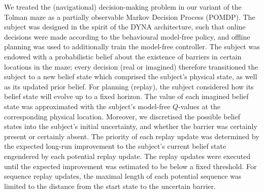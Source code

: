 We treated the (navigational) decision-making problem in our variant of the Tolman maze as a partially observable Markov Decision Process (POMDP). The subject was designed in the spirit of the DYNA architecture, such that online decisions were made according to the behavioural model-free policy, and offline planning was used to additionally train the model-free controller. The subject was endowed with a probabilistic belief about the existence of barriers in certain locations in the maze; every decision (real or imagined) therefore transitioned the subject to a new belief state which comprised the subject's physical state, as well as its updated prior belief. For planning (replay), the subject considered how its belief state will evolve up to a fixed horizon. The value of each imagined belief state was approximated with the subject's model-free $Q$-values at the corresponding physical location. Moreover, we discretised the possible belief states into the subject's initial uncertainty, and whether the barrier was certainly present or certainly absent. The priority of each replay update was determined by the expected long-run improvement to the subject's current belief state engendered by each potential replay update. The replay updates were executed until the expected improvement was estimated to be below a fixed threshold. For sequence replay updates, the maximal length of each potential sequence was limited to the distance from the start state to the uncertain barrier.